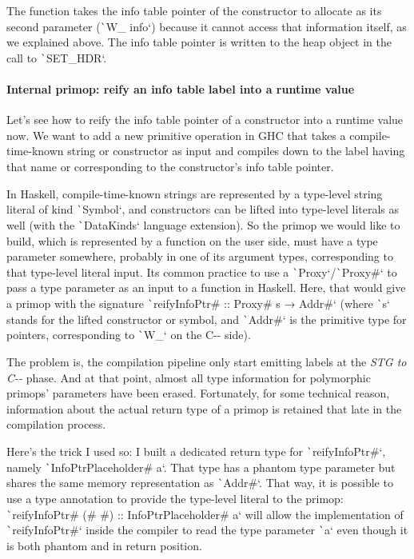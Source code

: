 \documentclass[english]{jflart}
\begin{document}
The function takes the info table pointer of the constructor to allocate as its second parameter (\texttt`W_ info`) because it cannot access that information itself, as we explained above. The info table pointer is written to the heap object in the call to \texttt`SET_HDR`.

\paragraph{Internal primop: reify an info table label into a runtime value}

Let's see how to reify the info table pointer of a constructor into a runtime value now. We want to add a new primitive operation in GHC that takes a compile-time-known string or constructor as input and compiles down to the label having that name or corresponding to the constructor's info table pointer.

In Haskell, compile-time-known strings are represented by a type-level string literal of kind \texttt`Symbol`, and constructors can be lifted into type-level literals as well (with the \texttt`DataKinds` language extension). So the primop we would like to build, which is represented by a function on the user side, must have a type parameter somewhere, probably in one of its argument types, corresponding to that type-level literal input. Its common practice to use a \texttt`Proxy`/\texttt`Proxy#` to pass a type parameter as an input to a function in Haskell. Here, that would give a primop with the signature \texttt`reifyInfoPtr# :: Proxy# s → Addr#` (where \texttt`s` stands for the lifted constructor or symbol, and \texttt`Addr#` is the primitive type for pointers, corresponding to \texttt`W_` on the C-{}- side).

The problem is, the compilation pipeline only start emitting labels at the \emph{STG to C-{}-} phase. And at that point, almost all type information for polymorphic primops' parameters have been erased. Fortunately, for some technical reason, information about the actual return type of a primop is retained that late in the compilation process.

Here's the trick I used so: I built a dedicated return type for \texttt`reifyInfoPtr#`, namely \texttt`InfoPtrPlaceholder# a`. That type has a phantom type parameter but shares the same memory representation as \texttt`Addr#`. That way, it is possible to use a type annotation to provide the type-level literal to the primop: \texttt`reifyInfoPtr# (# #) :: InfoPtrPlaceholder# a` will allow the implementation of \texttt`reifyInfoPtr#` inside the compiler to read the type parameter \texttt`a` even though it is both phantom and in return position.
\end{document}
